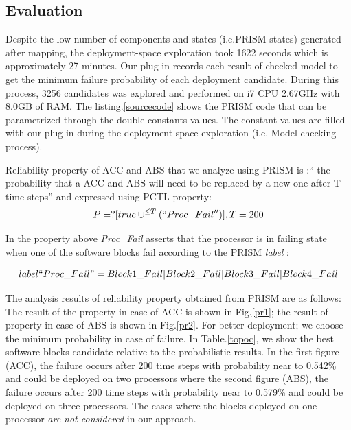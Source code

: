 \documentclass[3p,times,procedia,authoryear,round]{elsarticle}
\begin{document}
\subsection{Evaluation}

Despite the low number of components and states (i.e.PRISM states) generated after mapping, the deployment-space exploration took 1622 seconds which is approximately 27 minutes. Our plug-in records each result of checked model to get the minimum failure probability of each deployment candidate. During this process, 3256 candidates was explored and performed on i7 CPU 2.67GHz with 8.0GB of RAM. The listing.\ref{sourcecode} shows the PRISM code that can be parametrized through the double constants values. The constant values are filled with our plug-in during the deployment-space-exploration (i.e. Model checking process). 

Reliability property of ACC and ABS that we analyze using PRISM is :`` the probability that a ACC and ABS will need to be replaced by a new one after T time steps'' and expressed using PCTL property:
\begin{equation}
    P=? [true \cup ^{\leq T} (``Proc\_Fail'')] , T=200
\end{equation}





In the property above \emph{Proc_Fail } asserts that the processor is in failing state when one of the software blocks fail according to the PRISM \emph{label} :

\begin{equation} label ``Proc\_Fail" = Block1\_Fail | Block2\_Fail |Block3\_Fail |Block4\_Fail
\end{equation}


The analysis results of reliability property obtained from PRISM are as follows: The result of the property in case of ACC is shown in Fig.\ref{pr1}; the result of property in case of ABS is shown in Fig.\ref{pr2}. For better deployment; we choose the minimum probability in case of failure. In Table.\ref{topoc}, we show the best software blocks candidate relative to the probabilistic results. In the first figure (ACC), the failure occurs after 200 time steps with probability near to 0.542\% and could be deployed on two processors where the second figure (ABS), the failure occurs after 200 time steps with probability near to 0.579\% and could be deployed on three processors. The cases where the blocks deployed on one processor \emph{are not considered} in our approach.
\end{document}
